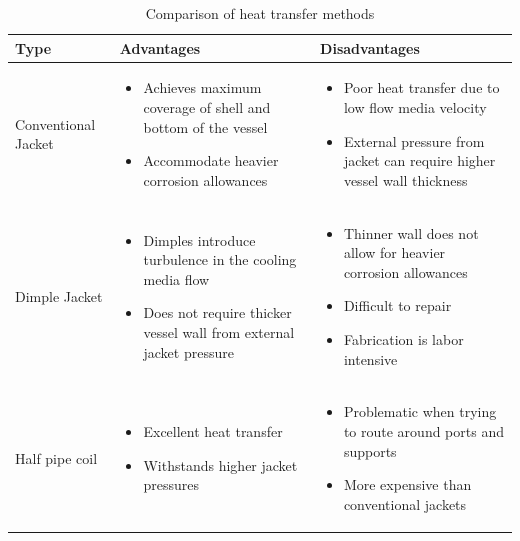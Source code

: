 \begin{table}
\caption{Comparison of heat transfer methods \cite{myerson_handbook_2019} }
\label{tab:heatransfermethodstype}
\begin{tabularx}{\linewidth}{@{}lXX@{}}
\toprule
Type & Advantages                 & Disadvantages                               \\ \midrule
Conventional Jacket & \begin{itemize}[label=+,leftmargin=1em]
  \item Achieves maximum coverage of shell and bottom of the vessel
  \item Accommodate heavier corrosion allowances
\end{itemize} & \begin{itemize}[label=-,leftmargin=1em]
  \item Poor heat transfer due to low flow media velocity
  \item External pressure from jacket can require higher vessel wall thickness 
\end{itemize} \\\midrule 
Dimple Jacket & \begin{itemize}[label=+,leftmargin=1em]
  \item Dimples introduce turbulence in the cooling media flow
  \item Does not require thicker vessel wall from external jacket pressure
\end{itemize} & \begin{itemize}[label=-,leftmargin=1em]
  \item Thinner wall does not allow for heavier corrosion allowances
  \item Difficult to repair
  \item Fabrication is labor intensive
\end{itemize} \\\midrule
Half pipe coil  &  \begin{itemize}[label=+,leftmargin=1em]
  \item Excellent heat transfer
  \item Withstands higher jacket pressures
\end{itemize} & \begin{itemize}[label=-,leftmargin=1em]
  \item Problematic when trying to route around ports and supports 
  \item More expensive than conventional jackets

\end{itemize}
\\\bottomrule
\end{tabularx}
\end{table}

